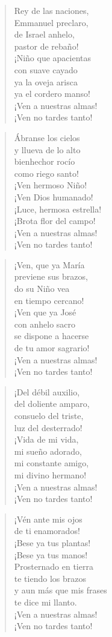 \documentclass[spanish,utf8,12pt,twocolumn]{chlart}
\newenvironment{gozo}{\begin{verse}\color{lector}}{\end{verse}}
\newcommand*\vena{{\color{responden}\hspace{1em}¡Ven a nuestras almas!\\\hspace{1em}¡Ven no tardes tanto!}}
\begin{document}
\begin{gozo}
Rey de las naciones,\\
Emmanuel preclaro,\\
de Israel anhelo,\\
pastor de rebaño!\\
¡Niño que apacientas\\
con suave cayado\\
ya la oveja arisca\\
ya el cordero manso!\\
\vena
\end{gozo}

\begin{gozo}
Ábranse los cielos\\
y llueva de lo alto\\
bienhechor rocío\\
como riego santo!\\
¡Ven hermoso Niño!\\
¡Ven Dios humanado!\\
¡Luce, hermosa estrella!\\
¡Brota flor del campo!\\
\vena
\end{gozo}

\begin{gozo}
¡Ven, que ya María\\
previene sus brazos,\\
do su Niño vea\\
en tiempo cercano!\\
¡Ven que ya José\\
con anhelo sacro\\
se dispone a hacerse\\
de tu amor sagrario!\\
\vena
\end{gozo}

\begin{gozo}
¡Del débil auxilio,\\
del doliente amparo,\\
consuelo del triste,\\
luz del desterrado!\\
¡Vida de mi vida,\\
mi sueño adorado,\\
mi constante amigo,\\
mi divino hermano!\\
\vena
\end{gozo}

\begin{gozo}
¡Vén ante mis ojos\\
de ti enamorados!\\
¡Bese ya tus plantas!\\
¡Bese ya tus manos!\\
Prosternado en tierra\\
te tiendo los brazos\\
y aun más que mis frases\\
te dice mi llanto.\\
\vena
\end{gozo}
\end{document}

